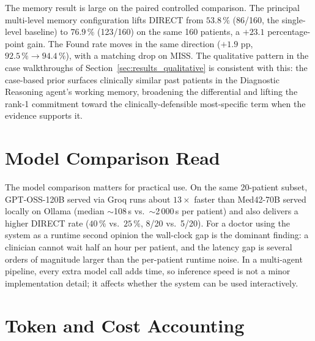 The memory result is large on the paired controlled comparison. The
principal multi-level memory configuration lifts DIRECT from
\textbf{$53.8\,\%$} (86/160, the single-level baseline) to
\textbf{$76.9\,\%$} (123/160) on the same 160 patients, a
$+23.1$ percentage-point gain. The Found rate moves in the same
direction ($+1.9$ pp, $92.5\,\% \to 94.4\,\%$), with a matching
drop on MISS. The qualitative pattern in the case walkthroughs of
Section~\ref{sec:results_qualitative} is consistent with this: the
case-based prior surfaces clinically similar past patients in the
Diagnostic Reasoning agent's working memory, broadening the
differential and lifting the rank-1 commitment toward the
clinically-defensible most-specific term when the evidence supports
it.

\section{Model Comparison Read}
\label{sec:discussion_model}

The model comparison matters for practical use. On the same
20-patient subset, GPT-OSS-120B served via Groq runs about
$13\times$ faster than Med42-70B served locally on Ollama (median
$\sim$108\,s vs.\ $\sim$2\,000\,s per patient) and also delivers a
higher DIRECT rate ($40\,\%$ vs.\ $25\,\%$, 8/20 vs.\ 5/20). For a
doctor using the system as a runtime second opinion the wall-clock
gap is the dominant finding: a clinician cannot wait half an hour
per patient, and the latency gap is several orders of magnitude
larger than the per-patient runtime noise. In a multi-agent
pipeline, every extra model call adds time, so inference speed is
not a minor implementation detail; it affects whether the system can
be used interactively.

\section{Token and Cost Accounting}
\label{sec:discussion_cost}

